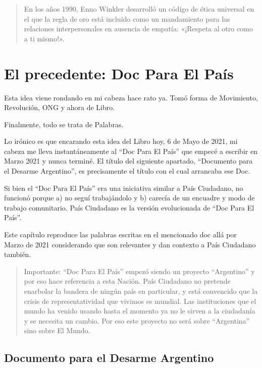 \documentclass[
]{book}
\begin{document}
\begin{quote}
En los años 1990, Enno Winkler desarrolló un código de ética universal en el que la regla de oro está incluido como un mandamiento para las relaciones interpersonales en ausencia de empatía: «¡Respeta al otro como a ti mismo!».
\end{quote}

\hypertarget{el-precedente-doc-para-el-pauxeds}{%
\chapter{El precedente: Doc Para El País}\label{el-precedente-doc-para-el-pauxeds}}

Esta idea viene rondando en mi cabeza hace rato ya. Tomó forma de Movimiento, Revolución, ONG y ahora de Libro.

Finalmente, todo se trata de Palabras.

Lo irónico es que encarando esta idea del Libro hoy, 6 de Mayo de 2021, mi cabeza me lleva instantáneamente al ``Doc Para El País'' que empecé a escribir en Marzo 2021 y nunca terminé. El título del siguiente apartado, ``Documento para el Desarme Argentino'', es precisamente el título con el cual arrancaba ese Doc.

Si bien el ``Doc Para El País'' era una iniciativa similar a País Ciudadano, no funcionó porque a) no seguí trabajándolo y b) carecía de un encuadre y modo de trabajo comunitario. País Ciudadano es la versión evolucionada de ``Doc Para El País''.

Este capítulo reproduce las palabras escritas en el mencionado doc allá por Marzo de 2021 considerando que son relevantes y dan contexto a País Ciudadano también.

\begin{quote}
Importante: ``Doc Para El País'' empezó siendo un proyecto ``Argentino'' y por eso hace referencia a esta Nación. País Ciudadano no pretende enarbolar la bandera de ningún país en particular, y está convencido que la crisis de representatividad que vivimos es mundial. Las instituciones que el mundo ha venido usando hasta el momento ya no le sirven a la ciudadanía y se necesita un cambio. Por eso este proyecto no será sobre ``Argentina'' sino sobre El Mundo.
\end{quote}

\hypertarget{documento-para-el-desarme-argentino}{%
\section{Documento para el Desarme Argentino}\label{documento-para-el-desarme-argentino}}
\end{document}
